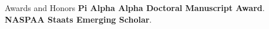 \begin{rubric}{Awards and Honors}
\entry*[2020]%
    \textbf{Pi Alpha Alpha Doctoral Manuscript Award}.
\entry*[2020]%
    \textbf{NASPAA Staats Emerging Scholar}.
\end{rubric}
